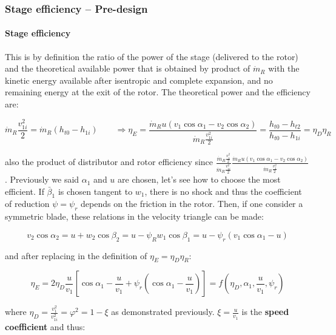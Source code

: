 \subsubsection{Stage efficiency – Pre-design}
\paragraph{Stage efficiency}
This is by definition the ratio of the power of the stage (delivered to the rotor) and the theoretical available power that is obtained by product of $\dot{m}_R$ with the kinetic energy available after isentropic and complete expansion, and no remaining energy at the exit of the rotor. The theoretical power and the efficiency are: 

\begin{equation}
\dot{m}_R\frac{v^2_{1i}}{2} = \dot{m}_R (h_{t0} - h_{1i}) \qquad \Rightarrow \eta _E = \frac{\dot{m }_R u(v_1 \cos \alpha _1 - v_2 \cos \alpha _2)}{\dot{m}_R\frac{v^2_{1i}}{2}} =  \frac{h_{t0} - h_{t2}}{ h_{t0} - h_{1i} } =  \eta _D \eta _R
\end{equation} 

also the product of distributor and rotor efficiency since $\frac{\dot{m}_R\frac{v_1^2}{2}}{\dot{m}_R\frac{v_{1i}^2}{2}}\frac{\dot{m }_R u(v_1 \cos \alpha _1 - v_2 \cos \alpha _2)}{\dot{m}_R\frac{v_1^2}{2}}$. Previously we said $\alpha _1$ and $u$ are chosen, let's see how to choose the most efficient. If $\bar{\beta}_1$ is chosen tangent to $w_1$, there is no shock and thus the coefficient of reduction $\psi = \psi _r$ depends on the friction in the rotor. Then, if one consider a symmetric blade, these relations in the velocity triangle can be made: 

\begin{equation}
v_2 \cos \alpha _2 = u + w_2 \cos \beta _2 = u - \psi _R w_1 \cos \beta _1 = u - \psi _r (v_1 \cos \alpha _1 - u)
\end{equation}

and after replacing in the definition of $\eta _E = \eta _D \eta _R$: 

\begin{equation}
\eta _E = 2\eta _D \frac{u}{v_1} \left[ \cos \alpha _1 - \frac{u}{v_1} + \psi _r \left( \cos \alpha _1 - \frac{u}{v_1}\right)\right] = f(\eta _D , \alpha _1, \frac{u}{v_1}, \psi _r)
\end{equation}

where $\eta _D = \frac{v_1^2}{v_{1i}^2} = \varphi ^2 = 1-\xi$ as demonstrated previously. $\xi = \frac{u}{v_1}$ is the \textbf{speed coefficient} and thus: 

